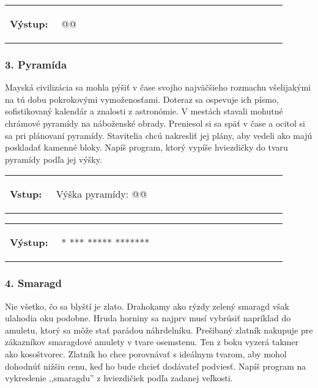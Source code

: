 \vspace{-2em}
\begin{tabular}{@{}p{0.15\linewidth}p{0.75\linewidth}}
\textbf{\small Výstup:} &
\vspace{-3em}
\begin{code}
@\fbox{\textit{*****}}@
\end{code}
\end{tabular}
\vspace{-2em}


\subsubsection*{3. Pyramída}
Mayská civilizácia sa mohla pýšiť v čase svojho najväčšieho rozmachu všelijakými na tú dobu pokrokovými vymoženosťami. Doteraz sa ospevuje ich písmo, sofistikovaný kalendár a znalosti z astronómie. V mestách stavali mohutné chrámové pyramídy na náboženské obrady. Preniesol si sa späť v čase a ocitol si sa pri plánovaní pyramídy. Stavitelia chcú nakresliť jej plány, aby vedeli ako majú poskladať kamenné bloky. Napíš program, ktorý vypíše hviezdičky do tvaru pyramídy podľa jej výšky.

\begin{tabular}{@{}p{0.15\linewidth}p{0.75\linewidth}}
\textbf{\small Vstup:} &
\vspace{-3em}
\begin{code}
Výška pyramídy: @\fbox{4}@
\end{code}
\end{tabular}

\vspace{-2em}
\begin{tabular}{@{}p{0.15\linewidth}p{0.75\linewidth}}
\textbf{\small Výstup:} &
\vspace{-3em}
\begin{code}
  *
 ***
*****
*******
\end{code}
\end{tabular}
\vspace{-2em}


\subsubsection*{4. Smaragd}
Nie všetko, čo sa blyští je zlato. Drahokamy ako rýzdy zelený smaragd však ulahodia oku podobne. Hruda horniny sa najprv musí vybrúsiť napríklad do amuletu, ktorý sa môže stať parádou náhrdelníku. Prešibaný zlatník nakupuje pre zákazníkov smaragdové amulety v tvare osemstenu. Ten z boku vyzerá takmer ako kosoštvorec. Zlatník ho chce porovnávať s ideálnym tvarom, aby mohol dohodnúť nižšiu cenu, keď ho bude chcieť dodávateľ podviesť. Napíš program na vykreslenie ,,smaragdu'' z hviezdičiek podľa zadanej veľkosti.

